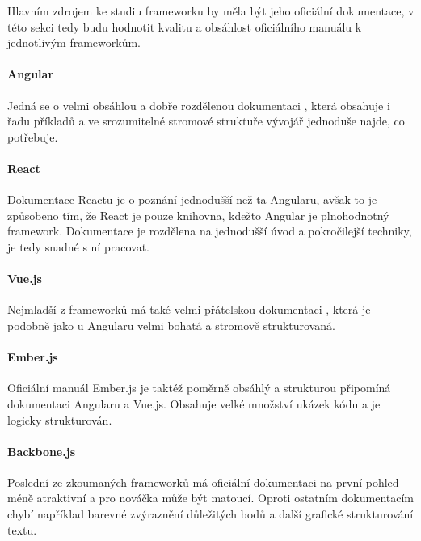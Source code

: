 Hlavním zdrojem ke studiu frameworku by měla být jeho oficiální dokumentace, v této sekci tedy budu hodnotit kvalitu a obsáhlost oficiálního manuálu k jednotlivým frameworkům.

\paragraph{Angular} Jedná se o velmi obsáhlou a dobře rozdělenou dokumentaci \cite{angular-doc}, která obsahuje i řadu příkladů a ve srozumitelné stromové struktuře vývojář jednoduše najde, co potřebuje.

\paragraph{React} Dokumentace Reactu \cite{react-doc} je o poznání jednodušší než ta Angularu, avšak to je způsobeno tím, že React je pouze knihovna, kdežto Angular je plnohodnotný framework. Dokumentace je rozdělena na jednodušší úvod a pokročilejší techniky, je tedy snadné s ní pracovat.

\paragraph{Vue.js} Nejmladší z frameworků má také velmi přátelskou dokumentaci \cite{vue-doc}, která je podobně jako u Angularu velmi bohatá a stromově strukturovaná.

\paragraph{Ember.js} Oficiální manuál Ember.js \cite{ember-doc} je taktéž poměrně obsáhlý a strukturou připomíná dokumentaci Angularu a Vue.js. Obsahuje velké množství ukázek kódu a je logicky strukturován.

\paragraph{Backbone.js} Poslední ze zkoumaných frameworků má oficiální dokumentaci \cite{backbone-doc} na první pohled méně atraktivní a pro nováčka může být matoucí. Oproti ostatním dokumentacím chybí například barevné zvýraznění důležitých bodů a další grafické strukturování textu.

